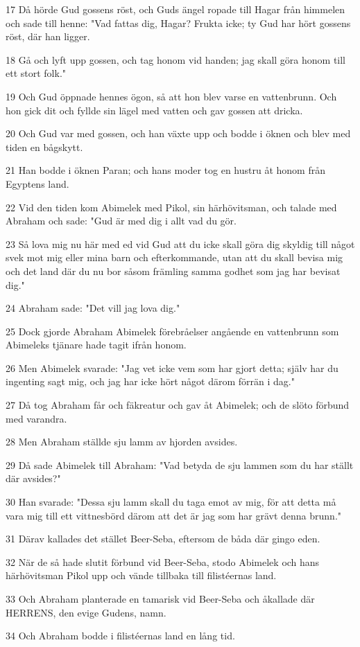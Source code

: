 \par 17 Då hörde Gud gossens röst, och Guds ängel ropade till Hagar från himmelen och sade till henne: "Vad fattas dig, Hagar? Frukta icke; ty Gud har hört gossens röst, där han ligger.
\par 18 Gå och lyft upp gossen, och tag honom vid handen; jag skall göra honom till ett stort folk."
\par 19 Och Gud öppnade hennes ögon, så att hon blev varse en vattenbrunn. Och hon gick dit och fyllde sin lägel med vatten och gav gossen att dricka.
\par 20 Och Gud var med gossen, och han växte upp och bodde i öknen och blev med tiden en bågskytt.
\par 21 Han bodde i öknen Paran; och hans moder tog en hustru åt honom från Egyptens land.
\par 22 Vid den tiden kom Abimelek med Pikol, sin härhövitsman, och talade med Abraham och sade: "Gud är med dig i allt vad du gör.
\par 23 Så lova mig nu här med ed vid Gud att du icke skall göra dig skyldig till något svek mot mig eller mina barn och efterkommande, utan att du skall bevisa mig och det land där du nu bor såsom främling samma godhet som jag har bevisat dig."
\par 24 Abraham sade: "Det vill jag lova dig."
\par 25 Dock gjorde Abraham Abimelek förebråelser angående en vattenbrunn som Abimeleks tjänare hade tagit ifrån honom.
\par 26 Men Abimelek svarade: "Jag vet icke vem som har gjort detta; själv har du ingenting sagt mig, och jag har icke hört något därom förrän i dag."
\par 27 Då tog Abraham får och fäkreatur och gav åt Abimelek; och de slöto förbund med varandra.
\par 28 Men Abraham ställde sju lamm av hjorden avsides.
\par 29 Då sade Abimelek till Abraham: "Vad betyda de sju lammen som du har ställt där avsides?"
\par 30 Han svarade: "Dessa sju lamm skall du taga emot av mig, för att detta må vara mig till ett vittnesbörd därom att det är jag som har grävt denna brunn."
\par 31 Därav kallades det stället Beer-Seba, eftersom de båda där gingo eden.
\par 32 När de så hade slutit förbund vid Beer-Seba, stodo Abimelek och hans härhövitsman Pikol upp och vände tillbaka till filistéernas land.
\par 33 Och Abraham planterade en tamarisk vid Beer-Seba och åkallade där HERRENS, den evige Gudens, namn.
\par 34 Och Abraham bodde i filistéernas land en lång tid.

